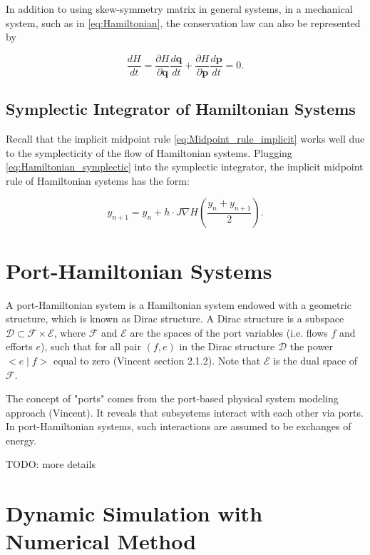 \documentclass[
	parskip, 			   %
	twoside, 			   %
	DIV=14, 			   %
	BCOR=15.0mm, 		   %
	headsepline, 		   %
	open=right, 		   %
	captions=tableheading, %
	bibliography=totoc,    %
	numbers=noenddot       %
]{scrreprt}
\begin{document}
In addition to using skew-symmetry matrix in general systems, in a mechanical system, such as in \ref{eq:Hamiltonian}, the conservation law can also be represented by

\begin{equation}
    \label{eq:Hamiltonian_invariant_in_mechaniacal_system}
    \frac{dH}{dt} = \frac{\partial H}{\partial \mathbf{q}} \frac{d \mathbf{q}}{dt} + \frac{\partial H}{\partial \mathbf{p}} \frac{d \mathbf{p}}{dt} = 0.
\end{equation}

\subsection{Symplectic Integrator of Hamiltonian Systems}
Recall that the implicit midpoint rule \ref{eq:Midpoint_rule_implicit} works well due to the symplecticity of the flow of Hamiltonian systems. Plugging \ref{eq:Hamiltonian_symplectic} into the symplectic integrator, the implicit midpoint rule of Hamiltonian systems has the form:

\begin{equation}
    \label{eq:Midpoint_rule_implicit_Hamiltonian}
    y_{n+1} = y_{n} + h \cdot J \nabla H (\frac{y_{n} + y_{n+1}}{2}).
\end{equation}

\section{Port-Hamiltonian Systems}
A port-Hamiltonian system is a Hamiltonian system endowed with a geometric structure, which is known as Dirac structure. A Dirac structure is a subspace $\mathcal{D} \subset \mathcal{F} \times \mathcal{E}$, where $\mathcal{F}$ and $\mathcal{E}$ are the spaces of the port variables (i.e. flows $f$ and efforts $e$), such that for all pair $(f,e)$ in the Dirac structure $\mathcal{D}$ the power $<e \mid f>$ equal to zero (Vincent section 2.1.2). Note that $\mathcal{E}$ is the dual space of $\mathcal{F}$.

The concept of "ports" comes from the port-based physical system modeling approach (Vincent). It reveals that subsystems interact with each other via ports. In port-Hamiltonian systems, such interactions are assumed to be exchanges of energy.


TODO: more details
\section{Dynamic Simulation with Numerical Method}
\end{document}
